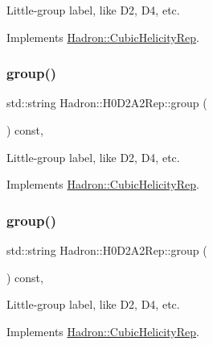 Little-\/group label, like D2, D4, etc. 

Implements \mbox{\hyperlink{structHadron_1_1CubicHelicityRep_a101a7d76cd8ccdad0f272db44b766113}{Hadron\+::\+Cubic\+Helicity\+Rep}}.

\mbox{\label{structHadron_1_1H0D2A2Rep_a447b40e4e175693969a3510643b01f46}} 
\subsubsection{\texorpdfstring{group()}{group()}\hspace{0.1cm}{\footnotesize\ttfamily [3/5]}}
{\footnotesize\ttfamily std\+::string Hadron\+::\+H0\+D2\+A2\+Rep\+::group (\begin{DoxyParamCaption}{ }\end{DoxyParamCaption}) const\hspace{0.3cm}{\ttfamily [inline]}, {\ttfamily [virtual]}}

Little-\/group label, like D2, D4, etc. 

Implements \mbox{\hyperlink{structHadron_1_1CubicHelicityRep_a101a7d76cd8ccdad0f272db44b766113}{Hadron\+::\+Cubic\+Helicity\+Rep}}.

\mbox{\label{structHadron_1_1H0D2A2Rep_a447b40e4e175693969a3510643b01f46}} 
\subsubsection{\texorpdfstring{group()}{group()}\hspace{0.1cm}{\footnotesize\ttfamily [4/5]}}
{\footnotesize\ttfamily std\+::string Hadron\+::\+H0\+D2\+A2\+Rep\+::group (\begin{DoxyParamCaption}{ }\end{DoxyParamCaption}) const\hspace{0.3cm}{\ttfamily [inline]}, {\ttfamily [virtual]}}

Little-\/group label, like D2, D4, etc. 

Implements \mbox{\hyperlink{structHadron_1_1CubicHelicityRep_a101a7d76cd8ccdad0f272db44b766113}{Hadron\+::\+Cubic\+Helicity\+Rep}}.

\mbox{\label{structHadron_1_1H0D2A2Rep_a447b40e4e175693969a3510643b01f46}} 
